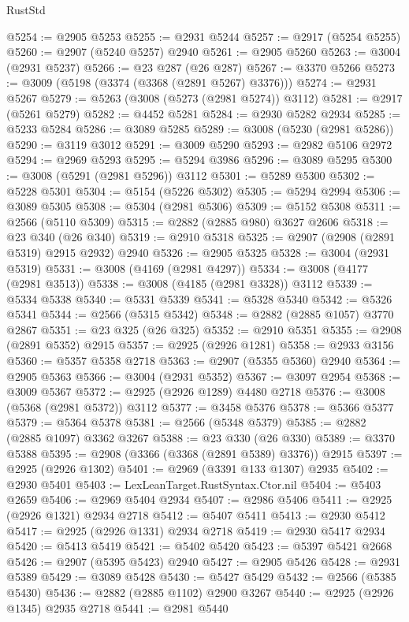 \begin{lexlean}{RustStd}
\begin{coremodule}
@5254 := @2905 @5253
@5255 := @2931 @5244
@5257 := @2917 (@5254 @5255)
@5260 := @2907 (@5240 @5257) @2940
@5261 := @2905 @5260
@5263 := @3004 (@2931 @5237)
@5266 := @23 @287 (@26 @287)
@5267 := @3370 @5266
@5273 := @3009 (@5198 (@3374 (@3368 (@2891 @5267) @3376)))
@5274 := @2931 @5267
@5279 := @5263 (@3008 (@5273 (@2981 @5274)) @3112)
@5281 := @2917 (@5261 @5279)
@5282 := @4452 @5281
@5284 := @2930 @5282 @2934
@5285 := @5233 @5284
@5286 := @3089 @5285
@5289 := @3008 (@5230 (@2981 @5286))
@5290 := @3119 @3012
@5291 := @3009 @5290
@5293 := @2982 @5106 @2972
@5294 := @2969 @5293
@5295 := @5294 @3986
@5296 := @3089 @5295
@5300 := @3008 (@5291 (@2981 @5296)) @3112
@5301 := @5289 @5300
@5302 := @5228 @5301
@5304 := @5154 (@5226 @5302)
@5305 := @5294 @2994
@5306 := @3089 @5305
@5308 := @5304 (@2981 @5306)
@5309 := @5152 @5308
@5311 := @2566 (@5110 @5309)
@5315 := @2882 (@2885 @980) @3627 @2606
@5318 := @23 @340 (@26 @340)
@5319 := @2910 @5318
@5325 := @2907 (@2908 (@2891 @5319) @2915 @2932) @2940
@5326 := @2905 @5325
@5328 := @3004 (@2931 @5319)
@5331 := @3008 (@4169 (@2981 @4297))
@5334 := @3008 (@4177 (@2981 @3513))
@5338 := @3008 (@4185 (@2981 @3328)) @3112
@5339 := @5334 @5338
@5340 := @5331 @5339
@5341 := @5328 @5340
@5342 := @5326 @5341
@5344 := @2566 (@5315 @5342)
@5348 := @2882 (@2885 @1057) @3770 @2867
@5351 := @23 @325 (@26 @325)
@5352 := @2910 @5351
@5355 := @2908 (@2891 @5352) @2915
@5357 := @2925 (@2926 @1281)
@5358 := @2933 @3156
@5360 := @5357 @5358 @2718
@5363 := @2907 (@5355 @5360) @2940
@5364 := @2905 @5363
@5366 := @3004 (@2931 @5352)
@5367 := @3097 @2954
@5368 := @3009 @5367
@5372 := @2925 (@2926 @1289) @4480 @2718
@5376 := @3008 (@5368 (@2981 @5372)) @3112
@5377 := @3458 @5376
@5378 := @5366 @5377
@5379 := @5364 @5378
@5381 := @2566 (@5348 @5379)
@5385 := @2882 (@2885 @1097) @3362 @3267
@5388 := @23 @330 (@26 @330)
@5389 := @3370 @5388
@5395 := @2908 (@3366 (@3368 (@2891 @5389) @3376)) @2915
@5397 := @2925 (@2926 @1302)
@5401 := @2969 (@3391 @133 @1307) @2935
@5402 := @2930 @5401
@5403 := LexLeanTarget.RustSyntax.Ctor.nil
@5404 := @5403 @2659
@5406 := @2969 @5404 @2934
@5407 := @2986 @5406
@5411 := @2925 (@2926 @1321) @2934 @2718
@5412 := @5407 @5411
@5413 := @2930 @5412
@5417 := @2925 (@2926 @1331) @2934 @2718
@5419 := @2930 @5417 @2934
@5420 := @5413 @5419
@5421 := @5402 @5420
@5423 := @5397 @5421 @2668
@5426 := @2907 (@5395 @5423) @2940
@5427 := @2905 @5426
@5428 := @2931 @5389
@5429 := @3089 @5428
@5430 := @5427 @5429
@5432 := @2566 (@5385 @5430)
@5436 := @2882 (@2885 @1102) @2900 @3267
@5440 := @2925 (@2926 @1345) @2935 @2718
@5441 := @2981 @5440

\end{coremodule}
\end{lexlean}
